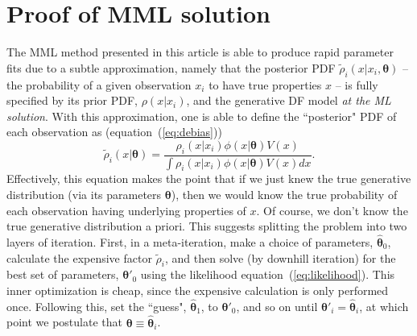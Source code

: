 \documentclass[a4paper,fleqn,usenatbib]{mnras}
\newcommand{\eq}[1]{equation~(\ref{eq:#1})}
\newcommand{\para}{{\bm{\theta}}}
\begin{document}


\appendix

\section{Proof of MML solution}\label{a:exactsolution}

The MML method presented in this article is able to produce rapid parameter fits due to a subtle approximation, namely that the posterior PDF $\tilde{\rho}_i(x|x_i,\para)$ -- the probability of a given observation $x_i$ to have true properties $x$ -- is fully specified by its prior PDF, $\rho(x|x_i)$, and the generative DF model \textit{at the ML solution}. 
With this approximation, one is able to define the ``posterior" PDF of each observation as (\eq{debias})
\begin{equation}
  \tilde{\rho}_i(x|\para) = \frac{\rho_i(x|x_i)\phi(x|\para)V(x)}{\int \rho_i(x|x_i) \phi(x|\para)V(x)dx}.
\end{equation}
Effectively, this equation makes the point that if we just knew the true generative distribution (via its parameters $\para$), then we would know the 
true probability of each observation having underlying properties of $x$.
Of course, we don't know the true generative distribution a priori. This suggests splitting the problem into two layers of iteration. First, in a meta-iteration, 
	make a choice of parameters, $\hat{\para}_0$, calculate the expensive factor $\tilde{\rho}_i$, and then solve (by downhill iteration) for the best set of parameters,
	$\para'_0$ using the likelihood \eq{likelihood}.
This inner optimization is cheap, since the expensive calculation is only performed once. Following this, set the ``guess", $\hat{\para}_1$, to $\para'_0$, and so on
	until $\para'_i = \hat{\para}_i$, at which point we postulate that $\para\equiv\hat{\para}_i$.
\end{document}
